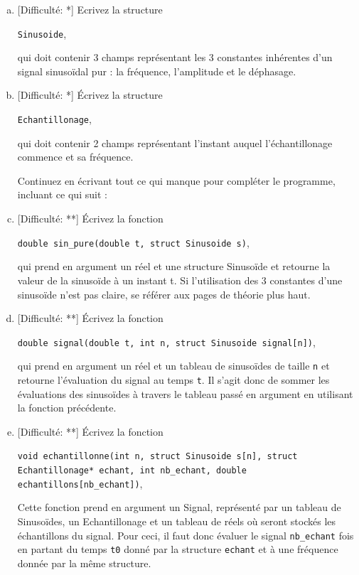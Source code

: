 \documentclass[11pt]{article}
\begin{document}
\begin{enumerate}[a)]

\item \textcolor{mygreen}{[Difficulté: *]}
Ecrivez la structure
\begin{center}
\texttt{Sinusoide}, 
\end{center}
qui doit contenir 3 champs représentant les 3 constantes inhérentes d'un signal sinusoïdal pur : la fréquence, l'amplitude et le déphasage.

\item \textcolor{mygreen}{[Difficulté: *]}
Écrivez la structure
\begin{center} 
\texttt{Echantillonage}, 
\end{center}
qui doit contenir 2 champs représentant l'instant auquel l'échantillonage commence et sa fréquence.

\vspace{20pt}
\hspace{-20pt} Continuez en écrivant tout ce qui manque pour compléter le programme, incluant ce qui suit :
\vspace{20pt}

\item \textcolor{mygreen}{[Difficulté: **]}
Écrivez la fonction
\begin{center} 
\texttt{double sin_pure(double t, struct Sinusoide s)}, 
\end{center}
qui prend en argument un réel et une structure Sinusoïde et retourne la valeur de la sinusoïde à un instant t. Si l'utilisation des 3 constantes d'une sinusoïde n'est pas claire, se référer aux pages de théorie plus haut.

\vspace{20pt}

\item \textcolor{mygreen}{[Difficulté: **]}
Écrivez la fonction
\begin{center} 
\texttt{double signal(double t, int n, struct Sinusoide signal[n])}, 
\end{center}
qui prend en argument un réel et un tableau de sinusoïdes de taille \texttt{n} et retourne l'évaluation du signal au temps \texttt{t}. Il s'agit donc de sommer les évaluations des sinusoïdes à travers le tableau passé en argument en utilisant la fonction précédente.

\vspace{20pt}

\item \textcolor{mygreen}{[Difficulté: **]}
Écrivez la fonction
\begin{center} 
\texttt{void echantillonne(int n, struct Sinusoide s[n],  
				   struct Echantillonage* echant,
                   int nb_echant, double echantillons[nb_echant])}, 
\end{center}
Cette fonction prend en argument un Signal, représenté par un tableau de Sinusoïdes, un Echantillonage et un tableau de réels où seront stockés les échantillons du signal. Pour ceci, il faut donc évaluer le signal \texttt{nb_echant} fois en partant du temps \texttt{t0} donné par la structure \texttt{echant} et à une fréquence donnée par la même structure. 



\end{enumerate}
\end{document}
